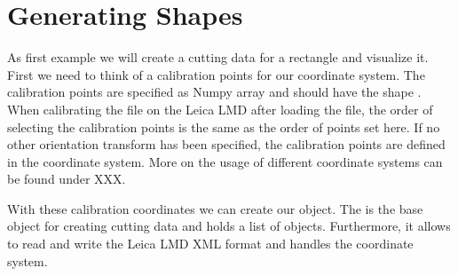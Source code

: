 \documentclass[letterpaper,10pt,english,openany,oneside]{sphinxmanual}
\begin{document}
\section{Generating Shapes}
\label{\detokenize{pages/quickstart:generating-shapes}}
\sphinxAtStartPar
As first example we will create a cutting data for a rectangle and visualize it. First we need to think of a calibration points for our coordinate system.  The calibration points are specified as Numpy array and should have the shape . When calibrating the file on the Leica LMD after loading the file, the order of selecting the calibration points is the same as the order of points set here. If no other orientation transform has been specified,  the calibration points are defined in the  coordinate system. More on the usage of different coordinate systems can be found under XXX.

\begin{sphinxVerbatim}[commandchars=\\\{\}]
   
    

  \PYG{p}{[}\PYG{p}{[} \PYG{p}{]}
                        \PYG{p}{[} \PYG{p}{]}
                        \PYG{p}{[} \PYG{p}{]}\PYG{p}{]}
\end{sphinxVerbatim}

\sphinxAtStartPar
With these calibration coordinates we can create our {\hyperref[\detokenize{pages/modules:lmd.lib.Collection}]{}} object. The {\hyperref[\detokenize{pages/modules:lmd.lib.Collection}]{}} is the base object for creating cutting data and holds a list of {\hyperref[\detokenize{pages/modules:lmd.lib.Shape}]{}} objects. Furthermore, it allows to read and write the Leica LMD XML format and handles the coordinate system.

\begin{sphinxVerbatim}[commandchars=\\\{\}]
    
\end{sphinxVerbatim}
\end{document}
